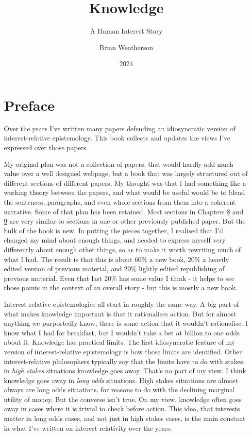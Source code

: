 \documentclass[
  10pt,
  letterpaper,
  twoside]{scrbook}
\title{Knowledge}
\subtitle{A Human Interest Story}
\author{Brian Weatherson}
\date{2024}
\renewcommand*\contentsname{Table of contents}
\newcommand\contentsname{Table of contents}
\begin{document}
\frontmatter
\maketitle

\renewcommand*\contentsname{Table of contents}
{
\setcounter{tocdepth}{2}
\tableofcontents
}
\mainmatter
{}

\chapter*{Preface}\label{sec-preface}


Over the years I've written many papers defending an idiosyncratic
version of interest-relative epistemology. This book collects and
updates the views I've expressed over those papers.

My original plan was not a collection of papers, that would hardly add
much value over a well designed webpage, but a book that was largely
structured out of different sections of different papers. My thought was
that I had something like a working theory between the papers, and what
would be useful would be to blend the sentences, paragraphs, and even
whole sections from them into a coherent narrative. Some of that plan
has been retained. Most sections in Chapters \hyperref[sec-ratbel]{8}
and \hyperref[sec-evidence]{9} are very similar to sections in one or
other previously published paper. But the bulk of the book is new. In
putting the pieces together, I realised that I'd changed my mind about
enough things, and needed to express myself very differently about
enough other things, so as to make it worth rewriting much of what I
had. The result is that this is about 60\% a new book, 20\% a heavily
edited version of previous material, and 20\% lightly edited
republishing of previous material. Even that last 20\% has some value I
think - it helps to see those points in the context of an overall story
- but this is mostly a new book.

Interest-relative epistemologies all start in roughly the same way. A
big part of what makes knowledge important is that it rationalises
action. But for almost anything we purportedly know, there is some
action that it wouldn't rationalise. I know what I had for breakfast,
but I wouldn't take a bet at billion to one odds about it. Knowledge has
practical limits. The first idiosyncratic feature of my version of
interest-relative epistemology is how those limits are identified. Other
interest-relative philosophers typically say that the limits have to do
with stakes; in \emph{high stakes} situations knowledge goes away.
That's no part of my view. I think knowledge goes away in \emph{long
odds} situations. High stakes situations are almost always are long odds
situations, for reasons to do with the declining marginal utility of
money. But the converse isn't true. On my view, knowledge often goes
away in cases where it is trivial to check before action. This idea,
that interests matter in long odds cases, and not just in high stakes
cases, is the main constant in what I've written on interest-relativity
over the years.
\end{document}
